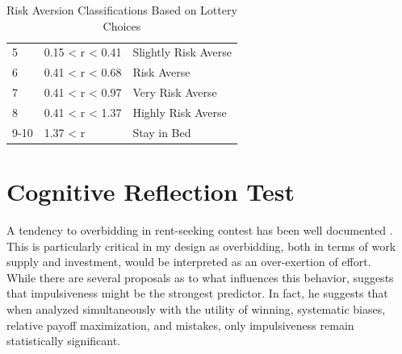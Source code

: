 \begin{table}[]
\begin{tabular}{lll}
    5                                                                 & 0.15 < r < 0.41                                                           & Slightly Risk Averse                                                      \\
    6                                                                 & 0.41 < r < 0.68                                                           & Risk Averse                                                               \\
    7                                                                 & 0.41 < r < 0.97                                                           & Very Risk Averse                                                          \\
    8                                                                 & 0.41 < r < 1.37                                                           & Highly Risk Averse                                                        \\
    9-10                                                              & 1.37 < r                                                                  & Stay in Bed\\
    \hline
    \end{tabular}
    \caption{Risk Aversion Classifications Based on Lottery Choices\\ \citep{holt2002}}
    \label{table:HL}
    \end{table}
    
    \section{Cognitive Reflection Test}
    
    A tendency to overbidding in rent-seeking contest has been well documented \citep{sheremeta2013, dechenaux2015}. This is particularly critical in my design as overbidding, both in terms of work supply and investment, would be interpreted as an over-exertion of effort.\\
     
    While there are several proposals as to what influences this behavior, \cite{sheremeta2016} suggests that impulsiveness might be the strongest predictor. In fact, he suggests that when analyzed simultaneously with the utility of winning, systematic biases, relative payoff maximization, and mistakes, only impulsiveness remain statistically significant.\\
    
